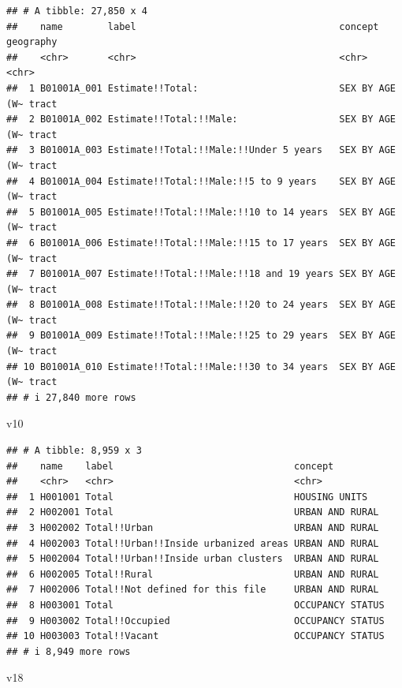 \documentclass[
]{article}
\newenvironment{Shaded}{\begin{snugshade}}{\end{snugshade}}
\newcommand{\NormalTok}[1]{#1}
\begin{document}
\begin{verbatim}
## # A tibble: 27,850 x 4
##    name        label                                    concept        geography
##    <chr>       <chr>                                    <chr>          <chr>    
##  1 B01001A_001 Estimate!!Total:                         SEX BY AGE (W~ tract    
##  2 B01001A_002 Estimate!!Total:!!Male:                  SEX BY AGE (W~ tract    
##  3 B01001A_003 Estimate!!Total:!!Male:!!Under 5 years   SEX BY AGE (W~ tract    
##  4 B01001A_004 Estimate!!Total:!!Male:!!5 to 9 years    SEX BY AGE (W~ tract    
##  5 B01001A_005 Estimate!!Total:!!Male:!!10 to 14 years  SEX BY AGE (W~ tract    
##  6 B01001A_006 Estimate!!Total:!!Male:!!15 to 17 years  SEX BY AGE (W~ tract    
##  7 B01001A_007 Estimate!!Total:!!Male:!!18 and 19 years SEX BY AGE (W~ tract    
##  8 B01001A_008 Estimate!!Total:!!Male:!!20 to 24 years  SEX BY AGE (W~ tract    
##  9 B01001A_009 Estimate!!Total:!!Male:!!25 to 29 years  SEX BY AGE (W~ tract    
## 10 B01001A_010 Estimate!!Total:!!Male:!!30 to 34 years  SEX BY AGE (W~ tract    
## # i 27,840 more rows
\end{verbatim}

\begin{Shaded}
\begin{Highlighting}[]
\NormalTok{v10}
\end{Highlighting}
\end{Shaded}

\begin{verbatim}
## # A tibble: 8,959 x 3
##    name    label                                concept         
##    <chr>   <chr>                                <chr>           
##  1 H001001 Total                                HOUSING UNITS   
##  2 H002001 Total                                URBAN AND RURAL 
##  3 H002002 Total!!Urban                         URBAN AND RURAL 
##  4 H002003 Total!!Urban!!Inside urbanized areas URBAN AND RURAL 
##  5 H002004 Total!!Urban!!Inside urban clusters  URBAN AND RURAL 
##  6 H002005 Total!!Rural                         URBAN AND RURAL 
##  7 H002006 Total!!Not defined for this file     URBAN AND RURAL 
##  8 H003001 Total                                OCCUPANCY STATUS
##  9 H003002 Total!!Occupied                      OCCUPANCY STATUS
## 10 H003003 Total!!Vacant                        OCCUPANCY STATUS
## # i 8,949 more rows
\end{verbatim}

\begin{Shaded}
\begin{Highlighting}[]
\NormalTok{v18}
\end{Highlighting}
\end{Shaded}
\end{document}
